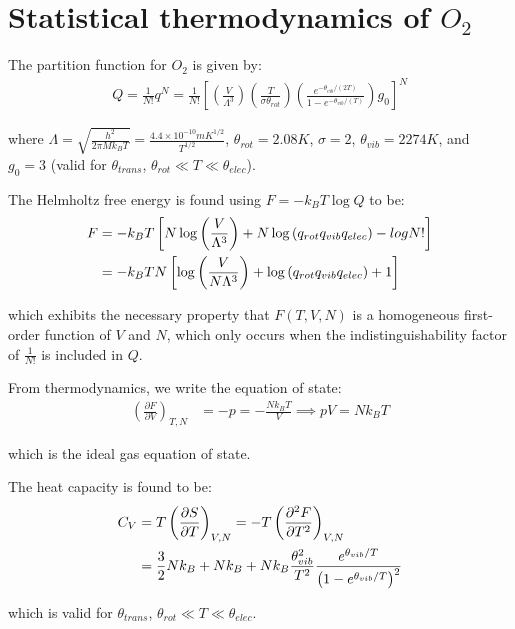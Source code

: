 \documentclass[book.tex]{subfiles}
\begin{document}
\section{Statistical thermodynamics of $O_2$}

The partition function for $O_2$ is given by:
\begin{align}\label{part_O2}
Q = \frac{1}{N!}q^N=\frac{1}{N!}\left[\left(\frac{V}{\Lambda^3}\right)\left(\frac{T}{\sigma \theta_{rot}}\right)\left(\frac{e^{-\theta_{vib}/(2T)}}{1-e^{-\theta_{vib}/(T)}}\right)g_0\right]^N
\end{align}

\noindent where $\Lambda = \sqrt{\frac{h^2}{2\pi Mk_BT}} = \frac{4.4\times 10^{-10} mK^{1/2}}{T^{1/2}}$, $\theta_{rot}=2.08K$, $\sigma = 2$, $\theta_{vib}=2274K$, and $g_0=3$ (valid for $\theta_{trans}$, $\theta_{rot} \ll T \ll \theta_{elec}$).

The Helmholtz free energy is found using $F=-k_BT\log Q$ to be:
\begin{align}\label{Helmholtz_O2}
F &=-k_BT\left[N\log \left(\frac{V}{\Lambda^3}\right)+N\log \left(q_{rot}q_{vib}q_{elec} \right) - log N! \right] \notag\\
&=-k_BTN \left[\log \left(\frac{V}{N \Lambda^3}\right)+\log \left(q_{rot}q_{vib}q_{elec} \right) +1 \right]
\end{align}

\noindent which exhibits the necessary property that $F(T,V,N)$ is a homogeneous first-order function of $V$ and $N$, which only occurs when the indistinguishability factor of  $\frac{1}{N!}$ is included in $Q$.

From thermodynamics, we write the equation of state:
\begin{align}
\left(\frac{\partial F}{\partial V}\right)_{T,N} &= -p = -\frac{Nk_BT}{V} \implies
pV= Nk_BT
\end{align}

\noindent which is the ideal gas equation of state.

The heat capacity is found to be:
\begin{align} \label{HeatCap_O2}
C_V &= T\left(\frac{\partial S}{\partial T}\right)_{V,N} = -T \left(\frac{\partial^2 F}{\partial T^2}\right)_{V,N} \notag\\
&=\frac{3}{2}Nk_B + Nk_B+Nk_B\frac{\theta_{vib}^2}{T^2}\frac{e^{\theta_{vib}/T}}{\left(1 - e^{\theta_{vib}/T}\right)^2}
\end{align}

\noindent which is valid for $\theta_{trans}$, $\theta_{rot} \ll T \ll \theta_{elec}$.
\end{document}
